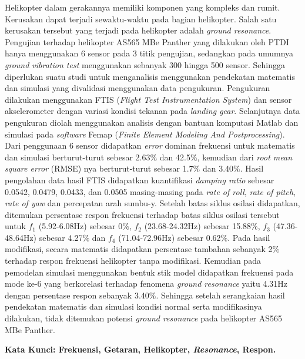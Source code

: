 Helikopter dalam gerakannya memiliki komponen yang kompleks dan rumit. Kerusakan dapat terjadi sewaktu-waktu pada bagian helikopter. Salah satu kerusakan tersebut yang terjadi pada helikopter adalah \textit{ground resonance}. Pengujian terhadap helikopter AS565 MBe Panther yang dilakukan oleh PTDI hanya menggunakan 6 sensor pada 3 titik pengujian, sedangkan pada umumnya \textit{ground vibration test} menggunakan sebanyak 300 hingga 500 sensor. Sehingga diperlukan suatu studi untuk menganalisis menggunakan pendekatan matematis dan simulasi yang divalidasi menggunakan data pengukuran. Pengukuran dilakukan menggunakan FTIS (\textit{Flight Test Instrumentation System}) dan sensor akselerometer dengan variasi kondisi tekanan pada \textit{landing gear}. Selanjutnya data pengukuran diolah menggunakan analisis dengan bantuan komputasi Matlab dan simulasi pada \textit{software} Femap (\textit{Finite Element Modeling And Postprocessing}). Dari penggunaan 6 sensor didapatkan \textit{error} dominan frekuensi untuk matematis dan simulasi berturut-turut sebesar 2.63$\%$ dan 42.5$\%$, kemudian dari \textit{root mean square error} (RMSE) nya berturut-turut sebesar 1.7$\%$ dan 3.40$\%$. Hasil pengolahan data hasil FTIS didapatkan kuantifikasi \textit{damping ratio} sebesar 0.0542, 0.0479, 0.0433, dan 0.0505 masing-masing pada \textit{rate of roll}, \textit{rate of pitch}, \textit{rate of yaw} dan percepatan arah sumbu-y. Setelah batas siklus osilasi didapatkan, ditemukan persentase respon frekuensi terhadap batas siklus osilasi tersebut untuk $f_1$ (5.92-6.08Hz) sebesar 0$\%$, $f_2$ (23.68-24.32Hz) sebesar 15.88$\%$, $f_3$ (47.36-48.64Hz) sebesar 4.27$\%$ dan $f_4$ (71.04-72.96Hz) sebesar 0.62$\%$. Pada hasil modifikasi, secara matematis didapatkan persentase tambahan sebanyak 2$\%$ terhadap respon frekuensi helikopter tanpa modifikasi. Kemudian pada pemodelan simulasi menggunakan bentuk stik model didapatkan frekuensi pada mode ke-6 yang berkorelasi terhadap fenomena \textit{ground resonance} yaitu 4.31Hz dengan persentase respon sebanyak 3.40$\%$. Sehingga setelah serangkaian hasil pendekatan matematis dan simulasi kondisi normal serta modifikasinya dilakukan, tidak ditemukan potensi \textit{ground resonance} pada helikopter AS565 MBe Panther.

\vspace{2ex}
\begingroup
\noindent
\begin{normalsize}
\textbf{Kata Kunci: Frekuensi, Getaran, Helikopter, \textit{Resonance}, Respon.}
\end{normalsize}
\endgroup

